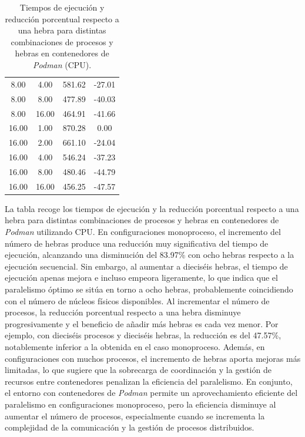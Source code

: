 \begin{table}[ht]
\begin{tabular}{|c|c|c|c|}
        8.00              & 4.00            & 581.62              & -27.01                         \\
        8.00              & 8.00            & 477.89              & -40.03                         \\
        8.00              & 16.00           & 464.91              & -41.66                         \\
        16.00             & 1.00            & 870.28              & 0.00                           \\
        16.00             & 2.00            & 661.10              & -24.04                         \\
        16.00             & 4.00            & 546.24              & -37.23                         \\
        16.00             & 8.00            & 480.46              & -44.79                         \\
        16.00             & 16.00           & 456.25              & -47.57                         \\
        \hline
    \end{tabular}
    \caption{Tiempos de ejecución y reducción porcentual respecto a una hebra para distintas combinaciones de procesos y hebras en contenedores de \textit{Podman} (CPU).}
    \label{tab:thread_sweep_ubuntu_podman_time}
\end{table}

La tabla recoge los tiempos de ejecución y la reducción porcentual respecto a una hebra para distintas combinaciones de procesos y hebras en contenedores de \textit{Podman} utilizando CPU. En configuraciones monoproceso, el incremento del número de hebras produce una reducción muy significativa del tiempo de ejecución, alcanzando una disminución del 83.97\% con ocho hebras respecto a la ejecución secuencial. Sin embargo, al aumentar a dieciséis hebras, el tiempo de ejecución apenas mejora e incluso empeora ligeramente, lo que indica que el paralelismo óptimo se sitúa en torno a ocho hebras, probablemente coincidiendo con el número de núcleos físicos disponibles. Al incrementar el número de procesos, la reducción porcentual respecto a una hebra disminuye progresivamente y el beneficio de añadir más hebras es cada vez menor. Por ejemplo, con dieciséis procesos y dieciséis hebras, la reducción es del 47.57\%, notablemente inferior a la obtenida en el caso monoproceso. Además, en configuraciones con muchos procesos, el incremento de hebras aporta mejoras más limitadas, lo que sugiere que la sobrecarga de coordinación y la gestión de recursos entre contenedores penalizan la eficiencia del paralelismo. En conjunto, el entorno con contenedores de \textit{Podman} permite un aprovechamiento eficiente del paralelismo en configuraciones monoproceso, pero la eficiencia disminuye al aumentar el número de procesos, especialmente cuando se incrementa la complejidad de la comunicación y la gestión de procesos distribuidos.

